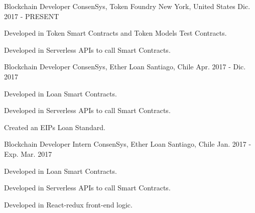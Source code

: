 \begin{cventries}
  \cventry
    {Blockchain Developer}
    {ConsenSys, Token Foundry}
    {New York, United States}
    {Dic. 2017 - PRESENT}
    {
      \begin{cvitems}
        \item {Developed in Token Smart Contracts and Token Models Test Contracts.}
        \item {Developed in Serverless APIs to call Smart Contracts.}
      \end{cvitems} 
    }
  \cventry
    {Blockchain Developer}
    {ConsenSys, Ether Loan}
    {Santiago, Chile}
    {Apr. 2017 - Dic. 2017}
    {
      \begin{cvitems}
        \item {Developed in Loan Smart Contracts.}
        \item {Developed in Serverless APIs to call Smart Contracts.}
        \item {Created an EIPs Loan Standard.}
      \end{cvitems}
    }
  \cventry
    {Blockchain Developer Intern}
    {ConsenSys, Ether Loan}
    {Santiago, Chile}
    {Jan. 2017 - Exp. Mar. 2017}
    {
      \begin{cvitems}
        \item {Developed in Loan Smart Contracts.}
        \item {Developed in Serverless APIs to call Smart Contracts.}
        \item {{Developed in React-redux front-end logic.}}
      \end{cvitems}
    }
\end{cventries}
